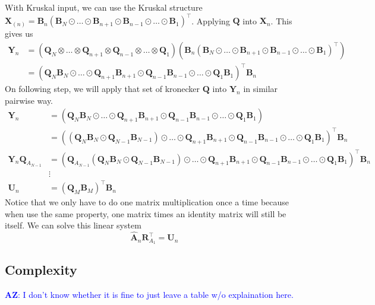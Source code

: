 \documentclass{article}
\newcommand{\mat}[1]{\mathbf{#1}}
\newcommand{\AZ}[1]{\textcolor{blue}{\textbf{AZ}: #1}}
\begin{document}
With Kruskal input, we can use the Kruskal structure $\mat{X}_{(n)} = \mat{B}_{n}(\mat{B}_{N} \odot \dots \odot \mat{B}_{n+1} \odot \mat{B}_{n-1}  \odot \dots \odot \mat{B}_{1})^\top$. 
Applying $\mat{Q}$ into $\mat{X}_n$. 
This gives us
\begin{align}
  \mat{Y}_n &= (\mat{Q}_N \otimes \dots \otimes \mat{Q}_{n+1} \otimes \mat{Q}_{n-1} \otimes \dots \otimes \mat{Q}_1)(\mat{B}_{n}(\mat{B}_{N} \odot \dots \odot \mat{B}_{n+1} \odot \mat{B}_{n-1}  \odot \dots \odot \mat{B}_{1})^\top) \nonumber \\
  &= (\mat{Q}_N\mat{B}_N \odot \dots \odot \mat{Q}_{n+1} \mat{B}_{n+1} \odot \mat{Q}_{n-1}\mat{B}_{n-1} \odot \dots \odot \mat{Q}_{1}\mat{B}_{1})^\top\mat{B}_n \nonumber   
\end{align}
On following step, we will apply that set of kronecker $\mat{Q}$ into $\mat{Y}_n$ in similar pairwise way.
\begin{align}
  \mat{Y}_n   &= (\mat{Q}_N\mat{B}_N \odot \dots \odot \mat{Q}_{n+1} \mat{B}_{n+1} \odot \mat{Q}_{n-1}\mat{B}_{n-1} \odot \dots \odot \mat{Q}_{1}\mat{B}_{1}) \nonumber   \\
      &= ((\mat{Q}_N\mat{B}_N \odot \mat{Q}_{N-1}\mat{B}_{N-1}) \odot \dots \odot \mat{Q}_{n+1} \mat{B}_{n+1} \odot \mat{Q}_{n-1}\mat{B}_{n-1} \odot \dots \odot \mat{Q}_{1}\mat{B}_{1})^\top\mat{B}_n \nonumber      \\
      \mat{Y}_n\mat{Q}_{A_{N-1}}  &= (\mat{Q}_{A_{N-1}}(\mat{Q}_N\mat{B}_N \odot \mat{Q}_{N-1}\mat{B}_{N-1}) \odot \dots \odot \mat{Q}_{n+1} \mat{B}_{n+1} \odot \mat{Q}_{n-1}\mat{B}_{n-1} \odot \dots \odot \mat{Q}_{1}\mat{B}_{1})^\top\mat{B}_n \nonumber \\
      & \vdots \nonumber \\
    \mat{U}_n  &= (\mat{Q}_{M}\mat{B}_M)^\top\mat{B}_n \nonumber  
\end{align}
Notice that we only have to do one matrix multiplication once a time because when use the same property, one matrix times an identity matrix will still be itself.
We can solve this linear system
\begin{equation}
  \mat{\hat{A}}_n\mat{R}_{A_1}^\top = \mat{U}_n 
\end{equation}





\subsection{Complexity}
\AZ{I don't know whether it is fine to just leave a table w/o explaination here.}
\end{document}
